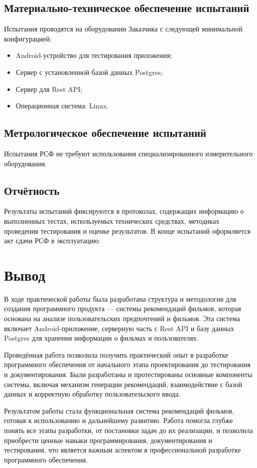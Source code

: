 \subsection{Материально-техническое обеспечение испытаний}

Испытания проводятся на оборудовании Заказчика с следующей минимальной конфигурацией:

\begin{itemize}
	\item Android-устройство для тестирования приложения;
	\item Сервер с установленной базой данных Postgres;
	\item Сервер для Rest API;
	\item Операционная система: Linux.
\end{itemize}

\subsection{Метрологическое обеспечение испытаний}

Испытания РСФ не требуют использования специализированного измерительного оборудования.

\subsection{Отчётность}

Результаты испытаний фиксируются в протоколах, содержащих информацию о выполненных тестах, используемых технических средствах, методиках проведения тестирования и оценке результатов. В конце испытаний оформляется акт сдачи РСФ в эксплуатацию.

\clearpage

\section*{\LARGE Вывод} 

В ходе практической работы была разработана структура и методология для создания программного продукта — системы рекомендаций фильмов, которая основана на анализе пользовательских предпочтений и фильмов. Эта система включает Android-приложение, серверную часть с Rest API и базу данных Postgres для хранения информации о фильмах и пользователях.\par

Проведённая работа позволила получить практический опыт в разработке программного обеспечения от начального этапа проектирования до тестирования и документирования. Были разработаны и протестированы основные компоненты системы, включая механизм генерации рекомендаций, взаимодействие с базой данных и корректную обработку пользовательского ввода.

Результатом работы стала функциональная система рекомендаций фильмов, готовая к использованию и дальнейшему развитию. Работа помогла глубже понять все этапы разработки, от постановки задач до их реализации, и позволила приобрести ценные навыки программирования, документирования и тестирования, что является важным аспектом в профессиональной разработке программного обеспечения.